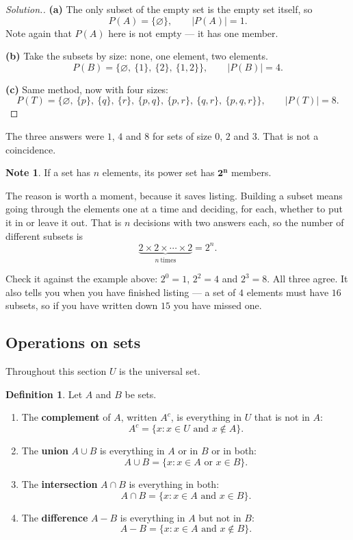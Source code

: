 \documentclass[11pt,a4paper]{article}
\theoremstyle{definition}
\newtheorem{definition}[thm]{Definition}
\newtheorem{note}[thm]{Note}
\newenvironment{solution}
  {\renewcommand{\qedsymbol}{}\begin{proof}[\textit{Solution}.]}
  {\end{proof}}
\begin{document}
\begin{solution}
\textbf{(a)} The only subset of the empty set is the empty set itself, so
$$P(A)=\{\varnothing\},\qquad |P(A)|=1.$$
Note again that $P(A)$ here is not empty --- it has one member.

\textbf{(b)} Take the subsets by size: none, one element, two elements.
$$P(B)=\big\{\varnothing,\ \{1\},\ \{2\},\ \{1,2\}\big\},\qquad |P(B)|=4.$$

\textbf{(c)} Same method, now with four sizes:
$$P(T)=\big\{\varnothing,\ \{p\},\ \{q\},\ \{r\},\ \{p,q\},\ \{p,r\},\ \{q,r\},\ \{p,q,r\}\big\},
\qquad |P(T)|=8.$$
\end{solution}

The three answers were $1$, $4$ and $8$ for sets of size $0$, $2$ and $3$. That is
not a coincidence.

\begin{note}
If a set has $n$ elements, its power set has $\boldsymbol{2^n}$ members.

The reason is worth a moment, because it saves listing. Building a subset means
going through the elements one at a time and deciding, for each, whether to put it in
or leave it out. That is $n$ decisions with two answers each, so the number of
different subsets is
$$\underbrace{2\times 2\times\cdots\times 2}_{n\ \text{times}}=2^n.$$
\end{note}

Check it against the example above: $2^0=1$, $2^2=4$ and $2^3=8$. All three agree. It
also tells you when you have finished listing --- a set of $4$ elements must have
$16$ subsets, so if you have written down $15$ you have missed one.

\subsection{Operations on sets}

Throughout this section $U$ is the universal set.

\begin{definition}
Let $A$ and $B$ be sets.
\begin{enumerate}
\item[(i).] The \textbf{complement} of $A$, written $A^c$, is everything in $U$ that
is not in $A$:
$$A^c=\{x : x\in U \text{ and } x\notin A\}.$$
\item[(ii).] The \textbf{union} $A\cup B$ is everything in $A$ or in $B$ or in both:
$$A\cup B=\{x : x\in A \text{ or } x\in B\}.$$
\item[(iii).] The \textbf{intersection} $A\cap B$ is everything in both:
$$A\cap B=\{x : x\in A \text{ and } x\in B\}.$$
\item[(iv).] The \textbf{difference} $A-B$ is everything in $A$ but not in $B$:
$$A-B=\{x : x\in A \text{ and } x\notin B\}.$$
\end{enumerate}
\end{definition}
\end{document}
